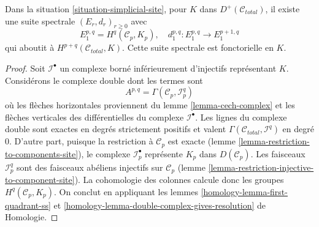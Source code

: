 \begin{lemma}
\label{lemma-simplicial-sheaf-cohomology-site}
Dans la situation \ref{situation-simplicial-site}, pour $K$ dans
$D^+(\mathcal{C}_{total})$, il existe une suite spectrale
$(E_r, d_r)_{r \geq 0}$ avec
$$
E_1^{p, q} = H^q(\mathcal{C}_p, K_p),\quad
d_1^{p, q} : E_1^{p, q} \to E_1^{p + 1, q}
$$
qui aboutit à $H^{p + q}(\mathcal{C}_{total}, K)$.
Cette suite spectrale est fonctorielle en $K$.
\end{lemma}

\begin{proof}
Soit $\mathcal{I}^\bullet$ un complexe borné inférieurement d'injectifs
représentant $K$. Considérons le complexe double dont les termes sont
$$
A^{p, q} = \Gamma(\mathcal{C}_p, \mathcal{I}^q_p)
$$
où les flèches horizontales proviennent du lemme \ref{lemma-cech-complex}
et les flèches verticales des différentielles du
complexe $\mathcal{I}^\bullet$. Les lignes du complexe double sont exactes
en degrés strictement positifs et valent
$\Gamma(\mathcal{C}_{total}, \mathcal{I}^q)$ en degré $0$.
D'autre part, puisque la restriction à $\mathcal{C}_p$ est exacte
(lemme \ref{lemma-restriction-to-components-site}),
le complexe $\mathcal{I}_p^\bullet$ représente $K_p$ dans
$D(\mathcal{C}_p)$. Les faisceaux $\mathcal{I}_p^q$ sont des
faisceaux abéliens injectifs sur $\mathcal{C}_p$
(lemme \ref{lemma-restriction-injective-to-component-site}).
La cohomologie des colonnes calcule donc les groupes
$H^q(\mathcal{C}_p, K_p)$. On conclut en appliquant les
lemmes \ref{homology-lemma-first-quadrant-ss} et
\ref{homology-lemma-double-complex-gives-resolution} de Homologie.
\end{proof}

